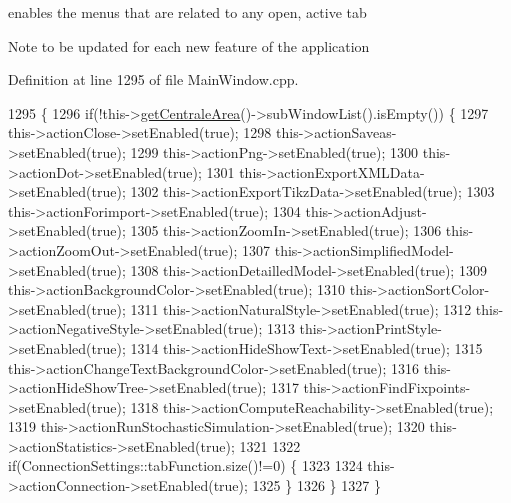 enables the menus that are related to any open, active tab 

\begin{DoxyNote}{Note}
to be updated for each new feature of the application 
\end{DoxyNote}


Definition at line 1295 of file Main\+Window.\+cpp.


\begin{DoxyCode}
1295                             \{
1296     \textcolor{keywordflow}{if}(!this->\hyperlink{classMainWindow_a7ef4a7c09626b415053b30bc412a3b1f}{getCentraleArea}()->subWindowList().isEmpty()) \{
1297         this->actionClose->setEnabled(\textcolor{keyword}{true});
1298         this->actionSaveas->setEnabled(\textcolor{keyword}{true});
1299         this->actionPng->setEnabled(\textcolor{keyword}{true});
1300         this->actionDot->setEnabled(\textcolor{keyword}{true});
1301         this->actionExportXMLData->setEnabled(\textcolor{keyword}{true});
1302         this->actionExportTikzData->setEnabled(\textcolor{keyword}{true});
1303         this->actionForimport->setEnabled(\textcolor{keyword}{true});
1304         this->actionAdjust->setEnabled(\textcolor{keyword}{true});
1305         this->actionZoomIn->setEnabled(\textcolor{keyword}{true});
1306         this->actionZoomOut->setEnabled(\textcolor{keyword}{true});
1307         this->actionSimplifiedModel->setEnabled(\textcolor{keyword}{true});
1308         this->actionDetailledModel->setEnabled(\textcolor{keyword}{true});
1309         this->actionBackgroundColor->setEnabled(\textcolor{keyword}{true});
1310         this->actionSortColor->setEnabled(\textcolor{keyword}{true});
1311         this->actionNaturalStyle->setEnabled(\textcolor{keyword}{true});
1312         this->actionNegativeStyle->setEnabled(\textcolor{keyword}{true});
1313         this->actionPrintStyle->setEnabled(\textcolor{keyword}{true});
1314         this->actionHideShowText->setEnabled(\textcolor{keyword}{true});
1315         this->actionChangeTextBackgroundColor->setEnabled(\textcolor{keyword}{true});
1316         this->actionHideShowTree->setEnabled(\textcolor{keyword}{true});
1317         this->actionFindFixpoints->setEnabled(\textcolor{keyword}{true});
1318         this->actionComputeReachability->setEnabled(\textcolor{keyword}{true});
1319         this->actionRunStochasticSimulation->setEnabled(\textcolor{keyword}{true});
1320         this->actionStatistics->setEnabled(\textcolor{keyword}{true});
1321 
1322         \textcolor{keywordflow}{if}(ConnectionSettings::tabFunction.size()!=0) \{
1323 
1324             this->actionConnection->setEnabled(\textcolor{keyword}{true});
1325         \}
1326     \}
1327 \}
\end{DoxyCode}
